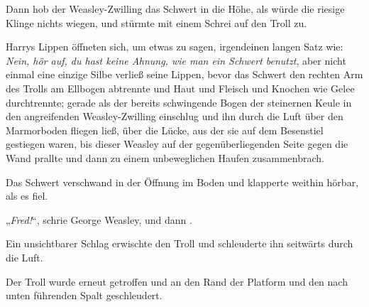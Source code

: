 Dann hob der Weasley-Zwilling das Schwert in die Höhe, als würde die riesige Klinge nichts wiegen, und stürmte mit einem Schrei auf den Troll zu.

Harrys Lippen öffneten sich, um etwas zu sagen, irgendeinen langen Satz wie: \emph{Nein, hör auf, du hast keine Ahnung, wie man ein Schwert benutzt}, aber nicht einmal eine einzige Silbe verließ seine Lippen, bevor das Schwert den rechten Arm des Trolls am Ellbogen abtrennte und Haut und Fleisch und Knochen wie Gelee durchtrennte; gerade als der bereits schwingende Bogen der steinernen Keule in den angreifenden Weasley-Zwilling einschlug und ihn durch die Luft über den Marmorboden fliegen ließ, über die Lücke, aus der sie auf dem Besenstiel gestiegen waren, bis dieser Weasley auf der gegenüberliegenden Seite gegen die Wand prallte und dann zu einem unbeweglichen Haufen zusammenbrach.

Das Schwert verschwand in der Öffnung im Boden und klapperte weithin hörbar, als es fiel.

„\emph{Fred!}“, schrie George Weasley, und dann .

Ein unsichtbarer Schlag erwischte den Troll und schleuderte ihn seitwärts durch die Luft.


Der Troll wurde erneut getroffen und an den Rand der Platform und den nach unten führenden Spalt geschleudert.


